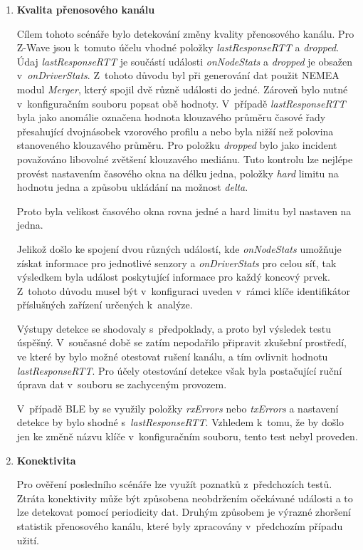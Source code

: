 \begin{enumerate} [label=\textbf{S.\arabic*}]
    \item \textbf{Kvalita přenosového kanálu}
    
    Cílem tohoto scénáře bylo detekování změny kvality přenosového kanálu. Pro Z-Wave jsou 
    k~tomuto účelu vhodné položky \textit{lastResponseRTT} a \textit{dropped}. Údaj
    \textit{lastResponseRTT} je součástí události \textit{onNodeStats} a 
    \textit{dropped} je obsažen v~\textit{onDriverStats}. Z~tohoto důvodu byl při generování dat použit
    NEMEA modul \textit{Merger}, který spojil dvě různě události do jedné. Zároveň bylo nutné
    v~konfiguračním souboru
     popsat obě hodnoty. V~případě \textit{lastResponseRTT} byla jako anomálie označena
    hodnota klouzavého průměru časové řady přesahující dvojnásobek vzorového profilu a nebo byla nižší
    než polovina stanoveného klouzavého průměru. Pro položku \textit{dropped} bylo jako incident považováno
    libovolné zvětšení klouzavého mediánu. Tuto kontrolu lze nejlépe provést nastavením časového okna
    na délku jedna, položky \textit{hard} limitu na hodnotu jedna a způsobu ukládání
    na možnost \textit{delta}.
    
    Proto byla velikost časového okna rovna jedné a hard limitu byl
    nastaven na jedna. 
    
    Jelikož došlo ke spojení dvou různých událostí, kde \textit{onNodeStats}
    umožňuje získat informace pro jednotlivé senzory a \textit{onDriverStats} pro celou síť, 
    tak výsledkem byla událost poskytující informace pro každý koncový prvek. Z~tohoto důvodu 
    musel být v~konfiguraci uveden v~rámci klíče identifikátor příslušných zařízení určených k~analýze.
    
    Výstupy detekce se shodovaly s~předpoklady, a proto byl výsledek testu úspěšný. V~současné
    době se zatím nepodařilo připravit zkušební prostředí, ve které by bylo možné otestovat
    rušení kanálu, a tím ovlivnit hodnotu \textit{lastResponseRTT}. Pro účely otestování 
    detekce však byla postačující ruční úprava dat v~souboru se zachyceným provozem. 
    
    V~případě BLE by se využily položky \textit{rxErrors} nebo \textit{txErrors} a nastavení 
    detekce by bylo shodné s~\textit{lastResponseRTT}. Vzhledem k~tomu, že by došlo jen 
    ke změně názvu klíče v~konfiguračním souboru, tento test nebyl proveden.
    
    \item \textbf{Konektivita}
    
    Pro ověření posledního scénáře lze využít poznatků z~předchozích testů. Ztráta konektivity
    může být způsobena neobdržením očekávané události a to lze detekovat pomocí periodicity dat.
    Druhým způsobem je výrazné zhoršení statistik přenosového kanálu, které byly zpracovány
    v~předchozím případu užití.
  \end{enumerate}
  
